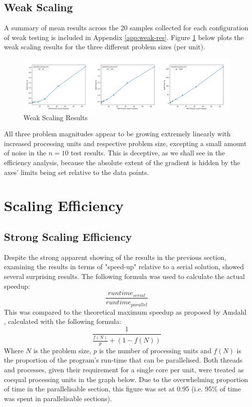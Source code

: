 \subsection{Weak Scaling}

A summary of mean results across the 20 samples collected for each configuration of weak testing is included in Appendix \ref{app:weak-res}. Figure \ref{fig:weak-results} below plots the weak scaling results for the three different problem sizes (per unit). 

\begin{figure}[H]
\centering
\includegraphics[width=18cm]{img/weak.png}
\caption{Weak Scaling Results}
\label{fig:weak-results}
\end{figure}

All three problem magnitudes appear to be growing extremely linearly with increased processing units and respective problem size, excepting a small amount of noise in the $n=10$ test results. This is deceptive, as we shall see in the efficiency analysis, because the absolute extent of the gradient is hidden by the axes' limits being set relative to the data points.

\section{Scaling Efficiency}
\subsection{Strong Scaling Efficiency}
Despite the strong apparent showing of the results in the previous section, examining the results in terms of "speed-up" relative to a serial solution, showed several surprising results. The following formula was used to calculate the actual speedup:
$$\frac{runtime_{serial}}{runtime_{parallel}}$$
This was compared to the theoretical maximum speedup as proposed by Amdahl \cite{Amdahl}, calculated with the following formula:
$$\frac{1}{\frac{f(N)}{p} + (1 - f(N))}$$
Where $N$ is the problem size, $p$ is the number of processing units and $f(N)$ is the proportion of the program's run-time that can be parallelised. Both threads and processes, given their requirement for a single core per unit, were treated as coequal processing units in the graph below. Due to the overwhelming proportion of time in the parallelisable section, this figure was set at 0.95 (i.e. 95\% of time was spent in parallelisable sections).

